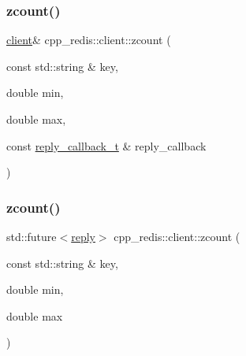 \mbox{\label{classcpp__redis_1_1client_a648afc3a38da6413e6b735d2708c3fe3}} 
\subsubsection{\texorpdfstring{zcount()}{zcount()}\hspace{0.1cm}{\footnotesize\ttfamily [3/6]}}
{\footnotesize\ttfamily \hyperlink{classcpp__redis_1_1client}{client}\& cpp\+\_\+redis\+::client\+::zcount (\begin{DoxyParamCaption}\item[{const std\+::string \&}]{key,  }\item[{double}]{min,  }\item[{double}]{max,  }\item[{const \hyperlink{classcpp__redis_1_1client_a061a1140d36d2eaeda82b09a0bb3f9f2}{reply\+\_\+callback\+\_\+t} \&}]{reply\+\_\+callback }\end{DoxyParamCaption})}

\mbox{\label{classcpp__redis_1_1client_a7d3ddea81b718564c060a51575d8c127}} 
\subsubsection{\texorpdfstring{zcount()}{zcount()}\hspace{0.1cm}{\footnotesize\ttfamily [4/6]}}
{\footnotesize\ttfamily std\+::future$<$\hyperlink{classcpp__redis_1_1reply}{reply}$>$ cpp\+\_\+redis\+::client\+::zcount (\begin{DoxyParamCaption}\item[{const std\+::string \&}]{key,  }\item[{double}]{min,  }\item[{double}]{max }\end{DoxyParamCaption})}

\mbox{\label{classcpp__redis_1_1client_a4638b70036c17ddd87dc204392ea7718}} 

